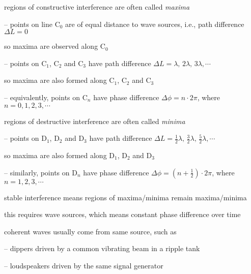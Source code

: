 \cmt regions of constructive interference are often called \emph{maxima}

\begin{compactitem}
	\item[--] points on line C$_0$ are of equal distance to wave sources, i.e., path difference $\Delta L = 0$
	
	so maxima are observed along C$_0$
	
	\item[--] points on C$_1$, C$_2$ and C$_3$ have path difference $\Delta L = \lambda, \, 2\lambda, \, 3\lambda, \cdots$
	
	so maxima are also formed along C$_1$, C$_2$ and C$_3$
	
	\item[--] equivalently, points on C$_n$ have phase difference $\Delta \phi = n\cdot 2\pi$, where $n=0,1,2,3,\cdots$
\end{compactitem} 

\cmt regions of destructive interference are often called \emph{minima}

\begin{compactitem}
	\item[--] points on D$_1$, D$_2$ and D$_3$ have path difference $\Delta L = \frac{1}{2}\lambda, \, \frac{3}{2}\lambda, \, \frac{5}{2}\lambda, \cdots$
	
	so maxima are also formed along D$_1$, D$_2$ and D$_3$
	
	\item[--] similarly, points on D$_n$ have phase difference $\Delta \phi = \left( n+\frac{1}{2} \right) \cdot 2\pi$, where $n=1,2,3,\cdots$
\end{compactitem} 






\newpage


\cmt stable interference means regions of maxima/minima remain maxima/minima

this requires  wave sources, which means constant phase difference over time

\cmt coherent waves usually come from same source, such as

\begin{compactitem}
	\item[--] dippers driven by a common vibrating beam in a ripple tank
	
	\item[--] loudspeakers driven by the same signal generator
\end{compactitem}

